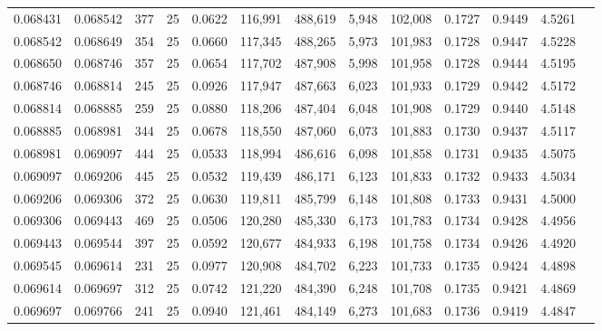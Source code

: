 \begin{tabular}{rrrrrrrrrrrrr}
0.068431 & 0.068542 &   377 &  25 &                                     0.0622 & 116,991 & 488,619 &   5,948 & 102,008 & 0.1727 & 0.9449 & 4.5261 \\
0.068542 & 0.068649 &   354 &  25 &                                     0.0660 & 117,345 & 488,265 &   5,973 & 101,983 & 0.1728 & 0.9447 & 4.5228 \\
0.068650 & 0.068746 &   357 &  25 &                                     0.0654 & 117,702 & 487,908 &   5,998 & 101,958 & 0.1728 & 0.9444 & 4.5195 \\
0.068746 & 0.068814 &   245 &  25 &                                     0.0926 & 117,947 & 487,663 &   6,023 & 101,933 & 0.1729 & 0.9442 & 4.5172 \\
0.068814 & 0.068885 &   259 &  25 &                                     0.0880 & 118,206 & 487,404 &   6,048 & 101,908 & 0.1729 & 0.9440 & 4.5148 \\
0.068885 & 0.068981 &   344 &  25 &                                     0.0678 & 118,550 & 487,060 &   6,073 & 101,883 & 0.1730 & 0.9437 & 4.5117 \\
0.068981 & 0.069097 &   444 &  25 &                                     0.0533 & 118,994 & 486,616 &   6,098 & 101,858 & 0.1731 & 0.9435 & 4.5075 \\
0.069097 & 0.069206 &   445 &  25 &                                     0.0532 & 119,439 & 486,171 &   6,123 & 101,833 & 0.1732 & 0.9433 & 4.5034 \\
0.069206 & 0.069306 &   372 &  25 &                                     0.0630 & 119,811 & 485,799 &   6,148 & 101,808 & 0.1733 & 0.9431 & 4.5000 \\
0.069306 & 0.069443 &   469 &  25 &                                     0.0506 & 120,280 & 485,330 &   6,173 & 101,783 & 0.1734 & 0.9428 & 4.4956 \\
0.069443 & 0.069544 &   397 &  25 &                                     0.0592 & 120,677 & 484,933 &   6,198 & 101,758 & 0.1734 & 0.9426 & 4.4920 \\
0.069545 & 0.069614 &   231 &  25 &                                     0.0977 & 120,908 & 484,702 &   6,223 & 101,733 & 0.1735 & 0.9424 & 4.4898 \\
0.069614 & 0.069697 &   312 &  25 &                                     0.0742 & 121,220 & 484,390 &   6,248 & 101,708 & 0.1735 & 0.9421 & 4.4869 \\
0.069697 & 0.069766 &   241 &  25 &                                     0.0940 & 121,461 & 484,149 &   6,273 & 101,683 & 0.1736 & 0.9419 & 4.4847 \\

\end{tabular}
